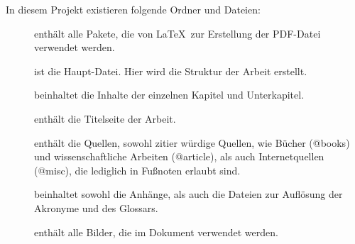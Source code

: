 In diesem Projekt existieren folgende Ordner und Dateien:\\
\begin{description}
    \item[] enthält alle Pakete, die von \LaTeX~zur Erstellung der PDF-Datei verwendet werden.
    \item[] ist die Haupt-Datei. Hier wird die Struktur der Arbeit erstellt.
    \item[] beinhaltet die Inhalte der einzelnen Kapitel und Unterkapitel.
    \item[] enthält die Titelseite der Arbeit.
    \item[] enthält die Quellen, sowohl zitier würdige Quellen, wie Bücher (@books)
        und wissenschaftliche Arbeiten (@article), als auch Internetquellen (@misc), die lediglich in Fußnoten erlaubt sind.
    \item[] beinhaltet sowohl die Anhänge, als auch die Dateien zur Auflösung der Akronyme und des Glossars.
    \item[] enthält alle Bilder, die im Dokument verwendet werden.
\end{description}


